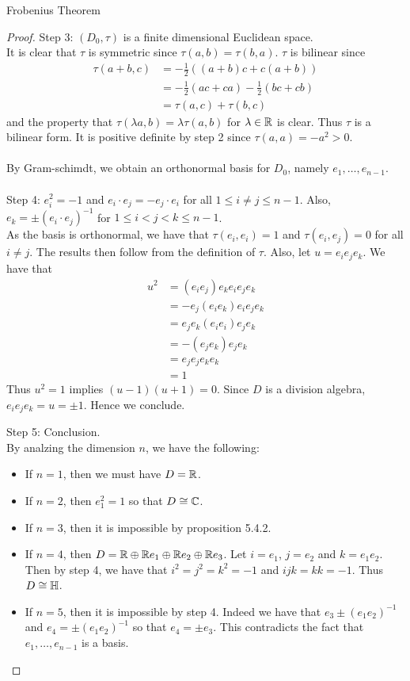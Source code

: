\documentclass[a4paper]{article}
\begin{document}
\begin{thm}{Frobenius Theorem}{}
\begin{proof}
Step 3: $(D_0,\tau)$ is a finite dimensional Euclidean space. \\
It is clear that $\tau$ is symmetric since $\tau(a,b)=\tau(b,a)$. $\tau$ is bilinear since 
\begin{align*}
\tau(a+b,c)&=-\frac{1}{2}((a+b)c+c(a+b))\\
&=-\frac{1}{2}(ac+ca)-\frac{1}{2}(bc+cb)\\
&=\tau(a,c)+\tau(b,c)
\end{align*} and the property that $\tau(\lambda a,b)=\lambda\tau(a,b)$ for $\lambda\in\mathbb{R}$ is clear. Thus $\tau$ is a bilinear form. It is positive definite by step 2 since $\tau(a,a)=-a^2>0$. \\~\\

By Gram-schimdt, we obtain an orthonormal basis for $D_0$, namely $e_1,\dots,e_{n-1}$. \\~\\

Step 4: $e_i^2=-1$ and $e_i\cdot e_j=-e_j\cdot e_i$ for all $1\leq i\neq j\leq n-1$. Also, $e_k=\pm(e_i\cdot e_j)^{-1}$ for $1\leq i<j<k\leq n-1$. \\
As the basis is orthonormal, we have that $\tau(e_i,e_i)=1$ and $\tau(e_i,e_j)=0$ for all $i\neq j$. The results then follow from the definition of $\tau$. Also, let $u=e_ie_je_k$. We have that 
\begin{align*}
u^2&=(e_ie_j)e_ke_ie_je_k\\
&=-e_j(e_ie_k)e_ie_je_k\\
&=e_je_k(e_ie_i)e_je_k\\
&=-(e_je_k)e_je_k\\
&=e_je_je_ke_k\\
&=1
\end{align*}
Thus $u^2=1$ implies $(u-1)(u+1)=0$. Since $D$ is a division algebra, $e_ie_je_k=u=\pm1$. Hence we conclude. 

Step 5: Conclusion. \\
By analzing the dimension $n$, we have the following: 
\begin{itemize}
\item If $n=1$, then we must have $D=\mathbb{R}$. 
\item If $n=2$, then $e_1^2=1$ so that $D\cong\mathbb{C}$. 
\item If $n=3$, then it is impossible by proposition 5.4.2. 
\item If $n=4$, then $D=\mathbb{R}\oplus\mathbb{R} e_1\oplus\mathbb{R} e_2\oplus\mathbb{R} e_3$. Let $i=e_1$, $j=e_2$ and $k=e_1e_2$. Then by step 4, we have that $i^2=j^2=k^2=-1$ and $ijk=kk=-1$. Thus $D\cong\mathbb{H}$. 
\item If $n=5$, then it is impossible by step 4. Indeed we have that $e_3\pm(e_1e_2)^{-1}$ and $e_4=\pm(e_1e_2)^{-1}$ so that $e_4=\pm e_3$. This contradicts the fact that $e_1,\dots,e_{n-1}$ is a basis. 
\end{itemize}
\end{proof}
\end{thm}
\end{document}
